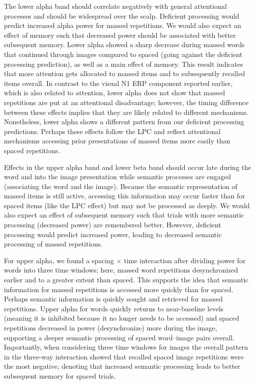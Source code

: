 The lower alpha band should correlate negatively with general attentional processes and should be widespread over the scalp.  Deficient processing would predict increased alpha power for massed repetitions.  We would also expect an effect of memory such that decreased power should be associated with better subsequent memory.
Lower alpha showed a sharp decrease during massed words that continued through images compared to spaced (going against the deficient processing prediction), as well as a main effect of memory.  This result indicates that more attention gets allocated to massed items and to subsequently recalled items overall.  In contrast to the visual N1 ERP component reported earlier, which is also related to attention, lower alpha does not show that massed repetitions are put at an attentional disadvantage; however, the timing difference between these effects implies that they are likely related to different mechanisms.
Nonetheless, lower alpha shows a different pattern from our deficient processing predictions.
\cbstart
Perhaps these effects follow the LPC and reflect attentional mechanisms accessing prior presentations of massed items more easily than spaced repetitions.
\cbend

Effects in the upper alpha band and lower beta band should occur late during the word and into the image presentation while semantic processes are engaged (associating the word and the image).  Because the semantic representation of massed items is still active, accessing this information may occur faster than for spaced items (like the LPC effect) but may not be processed as deeply.  We would also expect an effect of subsequent memory such that trials with more semantic processing (decreased power) are remembered better.  However, deficient processing would predict increased power, leading to decreased semantic processing of massed repetitions.

\cbstart
For upper alpha, we found a spacing $\times$ time interaction after dividing power for words into three time windows; here, massed word repetitions desynchronized earlier and to a greater extent than spaced. \cbend This supports the idea that semantic information for massed repetitions is accessed more quickly than for spaced.  Perhaps semantic information is quickly sought and retrieved for massed repetitions.  Upper alpha for words quickly returns to near-baseline levels (meaning it is inhibited because it no longer needs to be accessed) and spaced repetitions decreased in power (desynchronize) more during the image, supporting a deeper semantic processing of spaced word--image pairs overall.  Importantly, when considering three time windows for images the overall pattern in the three-way interaction showed that recalled spaced image repetitions were the most negative, denoting that increased semantic processing leads to better subsequent memory for spaced trials.


